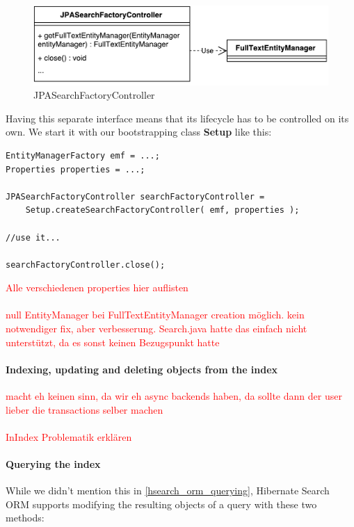 \begin{figure}[ht]
	\centering
	\includegraphics[scale=0.6]{images/JPASearchFactoryController.pdf}
	\caption{JPASearchFactoryController}
	\label{jpa_searchfactory_controller}
\end{figure}
\noindent
Having this separate interface means that its lifecycle has to be controlled on its own. We start it with our bootstrapping class \textbf{Setup} like this:
\\
\lstset{language=java}
\begin{lstlisting}[frame=htrbl, caption={MassIndexer usage with Hibernate Search ORM}, label={lst:massindexing_hsearch_orm.java}]
EntityManagerFactory emf = ...;
Properties properties = ...;

JPASearchFactoryController searchFactoryController =
	Setup.createSearchFactoryController( emf, properties );

//use it...

searchFactoryController.close();
\end{lstlisting}

\textcolor{red}{Alle verschiedenen properties hier auflisten}
\\\\
\textcolor{red}{null EntityManager bei FullTextEntityManager creation möglich. kein notwendiger fix, aber verbesserung. Search.java hatte das einfach nicht unterstützt, da es sonst keinen Bezugspunkt hatte}

\paragraph{Indexing, updating and deleting objects from the index}

\textcolor{red}{macht eh keinen sinn, da wir eh async backends haben, da sollte dann der user lieber die transactions selber machen}
\\\\
\textcolor{red}{InIndex Problematik erklären}

\paragraph{Querying the index}
While we didn't mention this in \ref{hsearch_orm_querying}, Hibernate Search ORM supports modifying the resulting objects of a query with these two methods:

